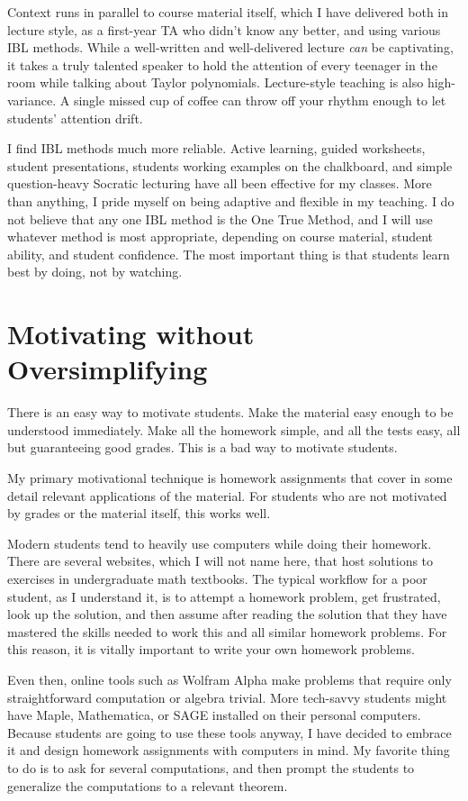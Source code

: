 \documentclass[11pt]{article}
\begin{document}
Context runs in parallel to course material itself, which I have delivered both
in lecture style, as a first-year TA who didn't know any better, and using
various IBL methods. While a well-written and well-delivered lecture \emph{can}
be captivating, it takes a truly talented speaker to hold the attention of every
teenager in the room while talking about Taylor polynomials. Lecture-style
teaching is also high-variance. A single missed cup of coffee can throw off your
rhythm enough to let students' attention drift.

I find IBL methods much more reliable. Active learning, guided worksheets,
student presentations, students working examples on the chalkboard, and simple
question-heavy Socratic lecturing have all been effective for my classes. More than
anything, I pride myself on being adaptive and flexible in my teaching. I do not
believe that any one IBL method is the One True Method, and I will use whatever
method is most appropriate, depending on course material, student ability, and
student confidence. The most important thing is that students learn best by
doing, not by watching.

\section{Motivating without Oversimplifying}

There is an easy way to motivate students. Make the material easy enough to be
understood immediately. Make all the homework simple, and all the tests easy,
all but guaranteeing good grades. This is a bad way to motivate students.

My primary motivational technique is homework assignments that cover in some
detail relevant applications of the material. For students who are not
motivated by grades or the material itself, this works well. 

Modern students tend to heavily use computers while doing their homework. There
are several websites, which I will not name here, that host solutions to
exercises in undergraduate math textbooks. The typical workflow for a poor
student, as I understand it, is to attempt a homework problem, get frustrated,
look up the solution, and then assume after reading the solution that they have
mastered the skills needed to work this and all similar homework problems. For
this reason, it is vitally important to write your own homework problems.

Even then, online tools such as Wolfram Alpha make problems that require only
straightforward computation or algebra trivial. More tech-savvy students might
have Maple, Mathematica, or SAGE installed on their personal computers. Because
students are going to use these tools anyway, I have decided to embrace it and
design homework assignments with computers in mind. My favorite thing to do is
to ask for several computations, and then prompt the students to generalize the
computations to a relevant theorem.
\end{document}
